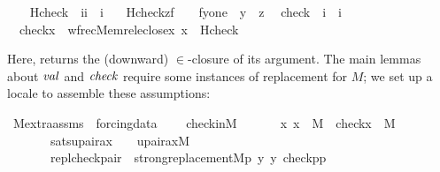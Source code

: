 \begin{isabelle}
\isamarkupfalse%
\ \isanewline
\ \ Hcheck\ {\isacharcolon}{\isacharcolon}\ {\isachardoublequoteopen}{\isacharbrackleft}i{\isacharcomma}i{\isacharbrackright}\ {\isasymRightarrow}\ i{\isachardoublequoteclose}\ \isanewline
\ \ {\isachardoublequoteopen}Hcheck{\isacharparenleft}z{\isacharcomma}f{\isacharparenright}\ \ {\isacharequal}{\isacharequal}\ {\isacharbraceleft}\ {\isacharless}f{\isacharbackquote}y{\isacharcomma}one{\isachargreater}\ {\isachardot}\ y\ {\isasymin}\ z{\isacharbraceright}{\isachardoublequoteclose}\isanewline
\isanewline
{}\isamarkupfalse%
\isanewline
\ \ check\ {\isacharcolon}{\isacharcolon}\ {\isachardoublequoteopen}i\ {\isasymRightarrow}\ i{\isachardoublequoteclose}\ \isanewline
\ \ {\isachardoublequoteopen}check{\isacharparenleft}x{\isacharparenright}\ {\isacharequal}{\isacharequal}\ wfrec{\isacharparenleft}Memrel{\isacharparenleft}eclose{\isacharparenleft}{\isacharbraceleft}x{\isacharbraceright}{\isacharparenright}{\isacharparenright}{\isacharcomma}\ x\ {\isacharcomma}\ Hcheck{\isacharparenright}{\isachardoublequoteclose}
\end{isabelle}
Here,  returns the (downward) $\in$-closure of its
argument. The main lemmas about $\operatorname{\mathit{val}}$ and $\operatorname{\mathit{check}}$ require some
instances of replacement for $M$; we set up a locale to assemble these
assumptions:
\begin{isabelle}
\isamarkupfalse%
\ M{\isacharunderscore}extra{\isacharunderscore}assms\ {\isacharequal}\ forcing{\isacharunderscore}data\ {\isacharplus}\isanewline
\ \ \ check{\isacharunderscore}in{\isacharunderscore}M\ {\isacharcolon}\ \ \ \ \ \  {\isachardoublequoteopen}{\isasymAnd}x{\isachardot}\ x\ {\isasymin}\ M\ {\isasymLongrightarrow}\ check{\isacharparenleft}x{\isacharparenright}\ {\isasymin}\ M{\isachardoublequoteclose}\isanewline
\ \ \ \ \ \ \ sats{\isacharunderscore}upair{\isacharunderscore}ax{\isacharcolon}\ \ \ \ {\isachardoublequoteopen}upair{\isacharunderscore}ax{\isacharparenleft}{\isacharhash}{\isacharhash}M{\isacharparenright}{\isachardoublequoteclose}\isanewline
\ \ \ \ \ \ \ repl{\isacharunderscore}check{\isacharunderscore}pair\ {\isacharcolon}\ {\isachardoublequoteopen}strong{\isacharunderscore}replacement{\isacharparenleft}{\isacharhash}{\isacharhash}M{\isacharcomma}{\isasymlambda}p\ y{\isachardot}\ y\ {\isacharequal}{\isacharless}check{\isacharparenleft}p{\isacharparenright}{\isacharcomma}p{\isachargreater}{\isacharparenright}{\isachardoublequoteclose}
\end{isabelle}

